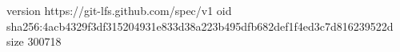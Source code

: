 version https://git-lfs.github.com/spec/v1
oid sha256:4acb4329f3df315204931e833d38a223b495dfb682def1f4ed3c7d816239522d
size 300718
